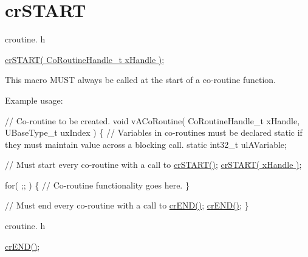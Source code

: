\hypertarget{group__cr_s_t_a_r_t}{}\section{cr\+S\+T\+A\+RT}
\label{group__cr_s_t_a_r_t}
croutine. h 
\begin{DoxyPre}
\hyperlink{vendor_2ceedling_2plugins_2freertos_2src_2freertos_2include_2croutine_8h_a19a57a201a325e8af1207ed68c4aedde}{crSTART( CoRoutineHandle\_t xHandle )};
\end{DoxyPre}


This macro M\+U\+ST always be called at the start of a co-\/routine function.

Example usage\+: 
\begin{DoxyPre}
// Co-routine to be created.
void vACoRoutine( CoRoutineHandle\_t xHandle, UBaseType\_t uxIndex )
\{
// Variables in co-routines must be declared static if they must maintain value across a blocking call.
static int32\_t ulAVariable;\end{DoxyPre}



\begin{DoxyPre}  // Must start every co-routine with a call to \hyperlink{vendor_2ceedling_2plugins_2freertos_2src_2freertos_2include_2croutine_8h_a19a57a201a325e8af1207ed68c4aedde}{crSTART()};
  \hyperlink{vendor_2ceedling_2plugins_2freertos_2src_2freertos_2include_2croutine_8h_a19a57a201a325e8af1207ed68c4aedde}{crSTART( xHandle )};\end{DoxyPre}



\begin{DoxyPre}  for( ;; )
  \{
       // Co-routine functionality goes here.
  \}\end{DoxyPre}



\begin{DoxyPre}  // Must end every co-routine with a call to \hyperlink{vendor_2ceedling_2plugins_2freertos_2src_2freertos_2include_2croutine_8h_ae6038cc976689b50000475ebfc4e2f23}{crEND()};
  \hyperlink{vendor_2ceedling_2plugins_2freertos_2src_2freertos_2include_2croutine_8h_ae6038cc976689b50000475ebfc4e2f23}{crEND()};
\}
\end{DoxyPre}


croutine. h 
\begin{DoxyPre}
\hyperlink{vendor_2ceedling_2plugins_2freertos_2src_2freertos_2include_2croutine_8h_ae6038cc976689b50000475ebfc4e2f23}{crEND()};
\end{DoxyPre}


